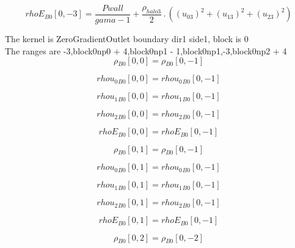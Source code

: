 \documentclass{article}
\begin{document}
\begin{dmath}{rhoE{_{B0}}}[{0,-3}] = \frac{Pwall}{gama - 1} + \frac{\rho_{halo 3}}{2} \,.\, \left(\left(u_{03} \right)^{2} + \left(u_{13} \right)^{2} + \left(u_{23} \right)^{2}\right)\end{dmath}

\noindent The kernel is ZeroGradientOutlet boundary dir1 side1, block is 0\\\noindent The ranges are -3,block0np0 + 4,block0np1 - 1,block0np1,-3,block0np2 + 4\\\begin{dmath}{\rho{_{B0}}}[{0,0}] = {\rho{_{B0}}}[{0,-1}]\end{dmath}

\begin{dmath}{rhou_{0}{_{B0}}}[{0,0}] = {rhou_{0}{_{B0}}}[{0,-1}]\end{dmath}

\begin{dmath}{rhou_{1}{_{B0}}}[{0,0}] = {rhou_{1}{_{B0}}}[{0,-1}]\end{dmath}

\begin{dmath}{rhou_{2}{_{B0}}}[{0,0}] = {rhou_{2}{_{B0}}}[{0,-1}]\end{dmath}

\begin{dmath}{rhoE{_{B0}}}[{0,0}] = {rhoE{_{B0}}}[{0,-1}]\end{dmath}

\begin{dmath}{\rho{_{B0}}}[{0,1}] = {\rho{_{B0}}}[{0,-1}]\end{dmath}

\begin{dmath}{rhou_{0}{_{B0}}}[{0,1}] = {rhou_{0}{_{B0}}}[{0,-1}]\end{dmath}

\begin{dmath}{rhou_{1}{_{B0}}}[{0,1}] = {rhou_{1}{_{B0}}}[{0,-1}]\end{dmath}

\begin{dmath}{rhou_{2}{_{B0}}}[{0,1}] = {rhou_{2}{_{B0}}}[{0,-1}]\end{dmath}

\begin{dmath}{rhoE{_{B0}}}[{0,1}] = {rhoE{_{B0}}}[{0,-1}]\end{dmath}

\begin{dmath}{\rho{_{B0}}}[{0,2}] = {\rho{_{B0}}}[{0,-2}]\end{dmath}
\end{document}
